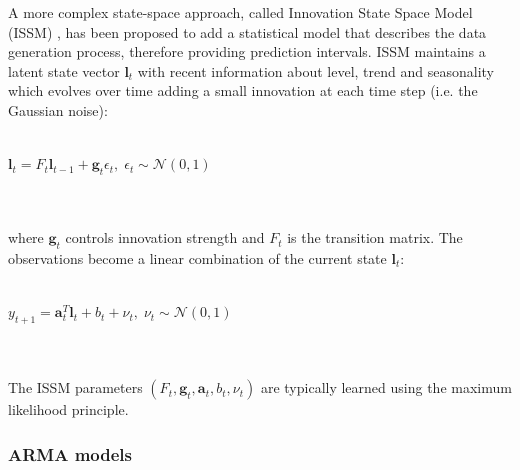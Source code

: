 \documentclass[a4paper]{article} %
\begin{document}
	A more complex state-space approach, called Innovation State Space Model (ISSM) \cite{ExponentialSmoothingStateSpace}, has been proposed to add a statistical model that describes the data generation process, therefore providing prediction intervals. ISSM maintains a latent state vector $\pmb{l}_t$ with recent information about level, trend and seasonality which evolves over time adding a small innovation at each time step (i.e. the Gaussian noise):\\\\
	\centerline{
	$
	\pmb{l}_t = F_t \pmb{l}_{t-1} + \pmb{g}_t \epsilon_t,\; \epsilon_t \sim \mathcal{N}(0,1)
	$
	}\\\\
	where $\pmb{g}_t$ controls innovation strength and $F_t$ is the transition matrix. 
	The observations become a linear combination of the current state $\pmb{l}_t$:\\\\
	\centerline{$
	y_{t+1} = \pmb{a}_{t}^T \pmb{l}_t + b_{t} + \nu_t,\; \nu_t \sim \mathcal{N}(0,1)
	$}\\\\
	The ISSM parameters $(F_t, \pmb{g}_t, \pmb{a}_t, b_t, \nu_t)$ are typically learned using the maximum likelihood principle.
	
	\subsubsection{ARMA models} \label{sssec:arma}
	
\end{document}
